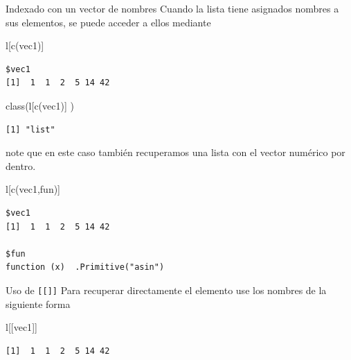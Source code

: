 \documentclass[
  ignorenonframetext,
  aspectratio=169,
  spanish,
]{beamer}
\newenvironment{Shaded}{\begin{snugshade}}{\end{snugshade}}
\newcommand{\FunctionTok}[1]{\textcolor[rgb]{0.28,0.35,0.67}{#1}}
\newcommand{\NormalTok}[1]{\textcolor[rgb]{0.00,0.23,0.31}{#1}}
\newcommand{\StringTok}[1]{\textcolor[rgb]{0.13,0.47,0.30}{#1}}
\begin{document}
\begin{frame}[fragile]{Indexado con un vector de nombres}
\label{indexado-con-un-vector-de-nombres}
Cuando la lista tiene asignados nombres a sus elementos, se puede
acceder a ellos mediante

\begin{Shaded}
\begin{Highlighting}[]
\NormalTok{l[}\FunctionTok{c}\NormalTok{(}\StringTok{\textquotesingle{}vec1\textquotesingle{}}\NormalTok{)] }
\end{Highlighting}
\end{Shaded}

\begin{verbatim}
$vec1
[1]  1  1  2  5 14 42
\end{verbatim}

\begin{Shaded}
\begin{Highlighting}[]
\FunctionTok{class}\NormalTok{(l[}\FunctionTok{c}\NormalTok{(}\StringTok{\textquotesingle{}vec1\textquotesingle{}}\NormalTok{)] ) }
\end{Highlighting}
\end{Shaded}

\begin{verbatim}
[1] "list"
\end{verbatim}

note que en este caso también recuperamos una lista con el vector
numérico por dentro.

\begin{Shaded}
\begin{Highlighting}[]
\NormalTok{l[}\FunctionTok{c}\NormalTok{(}\StringTok{\textquotesingle{}vec1\textquotesingle{}}\NormalTok{,}\StringTok{\textquotesingle{}fun\textquotesingle{}}\NormalTok{)]  }
\end{Highlighting}
\end{Shaded}

\begin{verbatim}
$vec1
[1]  1  1  2  5 14 42

$fun
function (x)  .Primitive("asin")
\end{verbatim}
\end{frame}

\begin{frame}[fragile]{Uso de \texttt{{[}{[}{]}{]}}}
\label{uso-de}
Para recuperar directamente el elemento use los nombres de la siguiente
forma

\begin{Shaded}
\begin{Highlighting}[]
\NormalTok{l[[}\StringTok{\textquotesingle{}vec1\textquotesingle{}}\NormalTok{]]  }
\end{Highlighting}
\end{Shaded}

\begin{verbatim}
[1]  1  1  2  5 14 42
\end{verbatim}
\end{frame}
\end{document}
